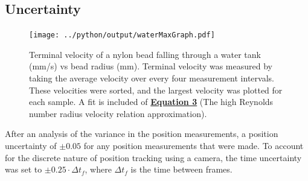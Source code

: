 \documentclass[
	letterpaper
	12pt
]{template}
\newcommand{\bref}[2]{\textbf{\hyperref[#1]{#2}}}
\begin{document}
\subsection{Uncertainty}\label{sec::uncertainty}

\begin{figure}\label{fig::terminalPlotW}
	\vspace{-32pt}
	\centering
	\texttt{[image: ../python/output/waterMaxGraph.pdf]}
	\caption{Terminal velocity of a nylon bead falling through a water tank (mm/s) vs bead radius (mm). Terminal velocity was measured by taking the average velocity over every four measurement intervals. These velocities were sorted, and the largest velocity was plotted for each sample. A fit is included of \bref{eqn::terminalVelocity}{Equation 3} (The high Reynolds number radius velocity relation approximation).}
	\vspace{-20pt}
\end{figure}

After an analysis of the variance in the position measurements, a position uncertainty of $\pm 0.05$ for any position measurements that were made. To account for the discrete nature of position tracking using a camera, the time uncertainty was set to $\pm 0.25 \cdot \Delta t_f$, where $\Delta t_f$ is the time between frames.\vspace{\baselineskip}
\end{document}
